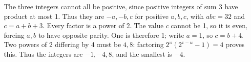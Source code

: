 The three integers cannot all be positive, since positive integers of sum 3 have product at most 1. Thus they are $-a,-b,c$ for positive $a,b,c$, with $abc=32$ and $c=a+b+3$. Every factor is a power of 2. The value $c$ cannot be 1, so it is even, forcing $a,b$ to have opposite parity. One is therefore 1; write $a=1$, so $c=b+4$. Two powers of 2 differing by 4 must be $4,8$: factoring $2^u(2^{v-u}-1)=4$ proves this. Thus the integers are $-1,-4,8$, and the smallest is $\boxed{-4}$.
